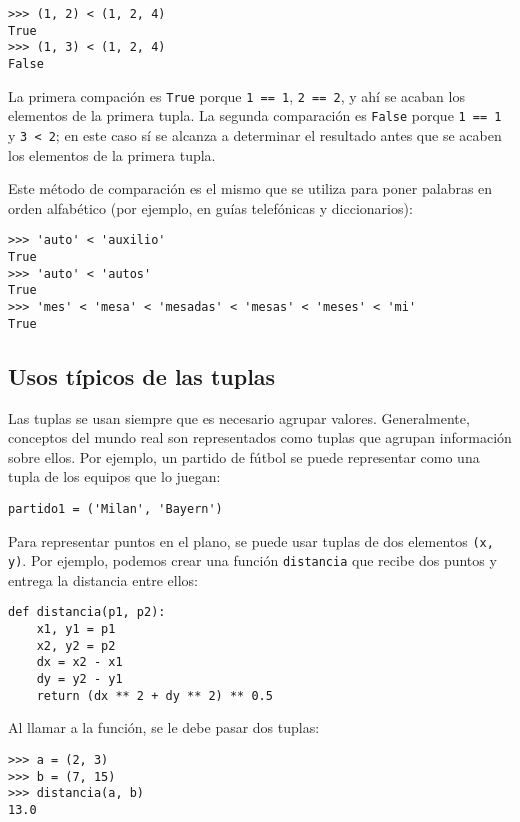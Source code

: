 \begin{lstlisting}
>>> (1, 2) < (1, 2, 4)
True
>>> (1, 3) < (1, 2, 4)
False
\end{lstlisting}

La primera compación es \lstinline!True! porque \lstinline!1 == 1!,
\lstinline!2 == 2!, y ahí se acaban los elementos de la primera tupla.
La segunda comparación es \lstinline!False! porque \lstinline!1 == 1! y
\lstinline!3 < 2!; en este caso sí se alcanza a determinar el resultado
antes que se acaben los elementos de la primera tupla.

Este método de comparación es el mismo que se utiliza para poner
palabras en orden alfabético (por ejemplo, en guías telefónicas y
diccionarios):

\begin{lstlisting}
>>> 'auto' < 'auxilio'
True
>>> 'auto' < 'autos'
True
>>> 'mes' < 'mesa' < 'mesadas' < 'mesas' < 'meses' < 'mi'
True
\end{lstlisting}

\subsection{Usos típicos de las tuplas}

Las tuplas se usan siempre que es necesario agrupar valores.
Generalmente, conceptos del mundo real son representados como tuplas que
agrupan información sobre ellos. Por ejemplo, un partido de fútbol se
puede representar como una tupla de los equipos que lo juegan:

\begin{lstlisting}
partido1 = ('Milan', 'Bayern')
\end{lstlisting}

Para representar puntos en el plano, se puede usar tuplas de dos
elementos \lstinline!(x, y)!. Por ejemplo, podemos crear una función
\lstinline!distancia! que recibe dos puntos y entrega la distancia entre
ellos:

\begin{lstlisting}
def distancia(p1, p2):
    x1, y1 = p1
    x2, y2 = p2
    dx = x2 - x1
    dy = y2 - y1
    return (dx ** 2 + dy ** 2) ** 0.5
\end{lstlisting}

Al llamar a la función, se le debe pasar dos tuplas:

\begin{lstlisting}
>>> a = (2, 3)
>>> b = (7, 15)
>>> distancia(a, b)
13.0
\end{lstlisting}

